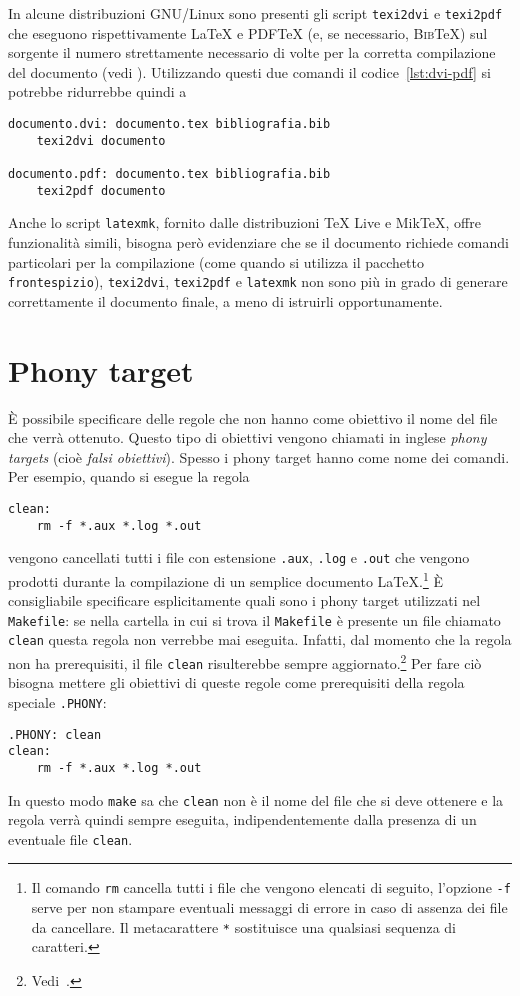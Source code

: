 In alcune distribuzioni GNU/Linux sono presenti gli script \texttt{texi2dvi} e
\texttt{texi2pdf} che eseguono rispettivamente \LaTeX{}
e \textsc{PDF}\TeX{}
(e, se necessario, \textsc{Bib}\TeX) sul sorgente il numero strettamente
necessario di volte per la corretta compilazione del documento (vedi
\textcite[63]{caucci:tabelle}).  Utilizzando questi due comandi il
codice~\ref{lst:dvi-pdf} si potrebbe ridurrebbe quindi a
\begin{lstlisting}
documento.dvi: documento.tex bibliografia.bib
	texi2dvi documento

documento.pdf: documento.tex bibliografia.bib
	texi2pdf documento
\end{lstlisting}
Anche lo script \texttt{latexmk}, fornito dalle distribuzioni TeX Live e MikTeX,
offre funzionalità simili, bisogna però evidenziare che se il documento richiede
comandi particolari per la compilazione (come quando si utilizza il pacchetto
\texttt{frontespizio}), \texttt{texi2dvi}, \texttt{texi2pdf} e \texttt{latexmk}
non sono più in grado di generare correttamente il documento finale, a meno di
istruirli opportunamente.

\section{Phony target}
\label{sec:phony}

È possibile specificare delle regole che non hanno come obiettivo il nome del
file che verrà ottenuto.  Questo tipo di obiettivi vengono chiamati in inglese
\emph{phony targets} (cioè \emph{falsi obiettivi}).  Spesso i phony target hanno
come nome dei comandi. Per esempio, quando si esegue la regola
\begin{lstlisting}
clean:
	rm -f *.aux *.log *.out
\end{lstlisting}
vengono cancellati tutti i file con estensione \texttt{.aux}, \texttt{.log} e
\texttt{.out} che vengono prodotti durante la compilazione di un semplice
documento
\LaTeX.\footnote{Il comando \texttt{rm} cancella tutti i file che vengono
  elencati di seguito, l'opzione \texttt{-f} serve per non stampare eventuali
  messaggi di errore in caso di assenza dei file da cancellare.  Il
  metacarattere \texttt{*} sostituisce una qualsiasi sequenza di caratteri.}
È consigliabile specificare esplicitamente quali sono i phony target utilizzati
nel \texttt{Makefile}: se nella cartella in cui si trova il \texttt{Makefile} è
presente un file chiamato \texttt{clean} questa regola non verrebbe mai
eseguita.  Infatti, dal momento che la regola non ha prerequisiti, il file
\texttt{clean} risulterebbe sempre
aggiornato.\footnote{Vedi~\textcite[31]{gnu:make}.}  Per fare ciò bisogna
mettere gli obiettivi di queste regole come prerequisiti della regola speciale
\texttt{.PHONY}:
\begin{lstlisting}
.PHONY: clean
clean:
	rm -f *.aux *.log *.out
\end{lstlisting}
In questo modo \texttt{make} sa che \texttt{clean} non è il nome del file che si
deve ottenere e la regola verrà quindi sempre eseguita, indipendentemente dalla
presenza di un eventuale file \texttt{clean}.

